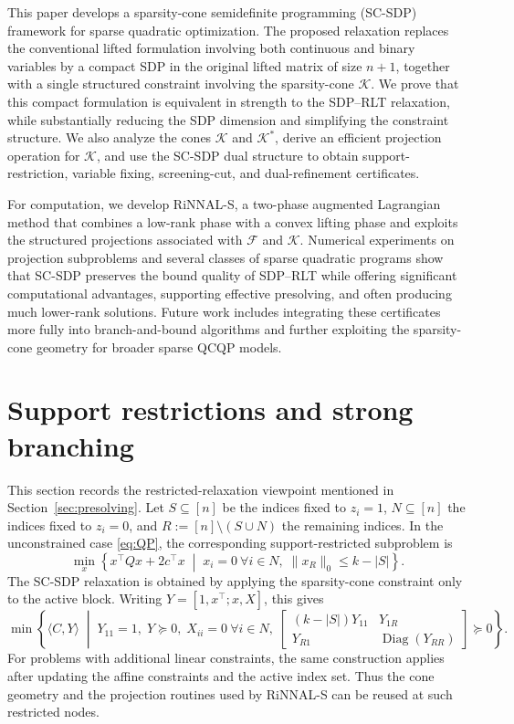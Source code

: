 \documentclass[11pt]{article}
\DeclareMathOperator{\Diag}{Diag}
\def\K{\mathcal{K}}
\theoremstyle{plain}
\begin{document}
This paper develops a sparsity-cone semidefinite programming (SC-SDP) framework for sparse quadratic optimization. The proposed relaxation replaces the conventional lifted formulation involving both continuous and binary variables by a compact SDP in the original lifted matrix of size $n+1$, together with a single structured constraint involving the sparsity-cone $\K$. We prove that this compact formulation is equivalent in strength to the SDP--RLT relaxation, while substantially reducing the SDP dimension and simplifying the constraint structure. We also analyze the cones $\mathcal K$ and $\mathcal K^*$, derive an efficient projection operation for $\mathcal K$, and use the SC-SDP dual structure to obtain support-restriction, variable fixing, screening-cut, and dual-refinement certificates.

For computation, we develop RiNNAL-S, a two-phase augmented Lagrangian method that combines a low-rank phase with a convex lifting phase and exploits the structured projections associated with $\mathcal F$ and $\mathcal K$. Numerical experiments on projection subproblems and several classes of sparse quadratic programs show that SC-SDP preserves the bound quality of SDP--RLT while offering significant computational advantages, supporting effective presolving, and often producing much lower-rank solutions. Future work includes integrating these certificates more fully into branch-and-bound algorithms and further exploiting the sparsity-cone geometry for broader sparse QCQP models.




\clearpage
\appendix

\section{Support restrictions and strong branching}\label{app:support-restrictions}

This section records the restricted-relaxation viewpoint mentioned in Section~\ref{sec:presolving}. Let $S\subseteq[n]$ be the indices fixed to $z_i=1$,  $N\subseteq[n]$  the indices fixed to $z_i=0$, and  $R:=[n]\setminus(S\cup N)$ the remaining indices. In the unconstrained case \eqref{eq:QP}, the corresponding support-restricted subproblem is
\[
\min_x\left\{x^\top Qx+2c^\top x
\;\middle|\;
x_i=0\ \forall i\in N,\;
\|x_R\|_0\le k-|S|
\right\}.
\]
The SC-SDP relaxation is obtained by applying the sparsity-cone constraint only to the active block. Writing $Y=[1,x^\top;x,X]$, this gives
\[
\min\left\{\langle C,Y\rangle
\;\middle|\;
Y_{11}=1,\;
Y\succeq 0,\;
X_{ii}=0\ \forall i\in N,\;
\begin{bmatrix}
(k-|S|)Y_{11} & Y_{1R}\\
Y_{R1} & \Diag(Y_{RR})
\end{bmatrix}\succeq 0
\right\}.
\]
For problems with additional linear constraints, the same construction applies after updating the affine constraints and the active index set. Thus the cone geometry and the projection routines used by RiNNAL-S can be reused at such restricted nodes.
\end{document}
